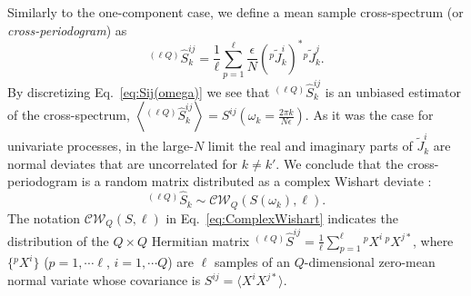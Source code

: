 Similarly to the one-component case, we define a mean sample cross-spectrum (or \emph{cross-periodogram}) as
\begin{equation}
 ^{(\ell Q)\!}\hat{S}_k^{ij} = \frac{1}{\ell} \sum_{p=1}^{\ell} \frac{\epsilon}{N} \left({}^{p\!}\tilde{J}_k^i\right)^* {}^{p\!}\tilde{J}_k^j .
\end{equation}
By discretizing Eq.~\eqref{eq:Sij(omega)} we see that $^{(\ell Q)\!}\hat{S}_k^{ij}$ is an unbiased estimator of the cross-spectrum, $\left \langle {}^{(\ell Q)\!}\hat{S}_k^{ij} \right \rangle = S^{ij}\left (\omega_k= \frac{2\pi k }{N\epsilon}\right )$. As it was the case for univariate processes, in the large-$N$ limit the real and imaginary parts of $\tilde J^i_k$ are normal deviates that are uncorrelated for $k\ne k'$. We conclude that the cross-periodogram is a random matrix distributed as a complex Wishart deviate \citep{Goodman1963a,Goodman1963b}:
\begin{equation}
  {}^{(\ell Q)\!}\hat{S}_k \sim \mathcal{CW}_Q \left(S(\omega_k), \ell\right). \label{eq:ComplexWishart}
\end{equation}
The notation $\mathcal{CW}_Q \left(S, \ell \right)$ in Eq.~\eqref{eq:ComplexWishart} indicates the distribution of the $Q\times Q$ Hermitian matrix
${}^{(\ell Q)\!}\hat{S}^{ij} = \frac{1}{\ell}\sum_{p=1}^\ell  {}^{p\!}{X}^i \, {}^{p\!}{X}^{j*}$,
where $\{ {}^{p\!}{X}^i \}$ ($p=1,\cdots\ell$, $i=1, \cdots Q$) are $\ell$ samples of an $Q$-dimensional zero-mean normal variate whose covariance is $S^{ij} = \langle X^i X^{j*} \rangle $.

